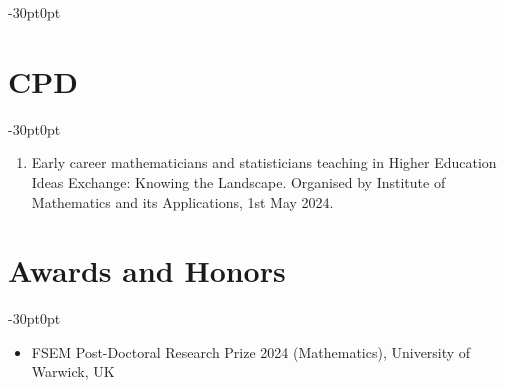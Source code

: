 \documentclass[line]{res}
\newenvironment{p1}
{\begin{adjustwidth}{-30pt}{0pt}
\vspace{8pt}}
{\end{adjustwidth}}
\begin{document}
\begin{resume}
\begin{p1}
\begin{enumerate}
		\end{enumerate}
	\end{p1}

	\section{CPD}
	\begin{p1}
		\begin{enumerate}
			\item Early career mathematicians and statisticians teaching in Higher Education Ideas Exchange: Knowing the Landscape. Organised by Institute of Mathematics and its Applications, 1st May 2024.
			
		\end{enumerate}
	\end{p1}

 \section{Awards and Honors}
 	\begin{p1}
		\begin{itemize}
			\item FSEM Post-Doctoral Research Prize 2024 (Mathematics), University of Warwick, UK			
		\end{itemize}
	\end{p1}




\end{resume}
\end{document}
